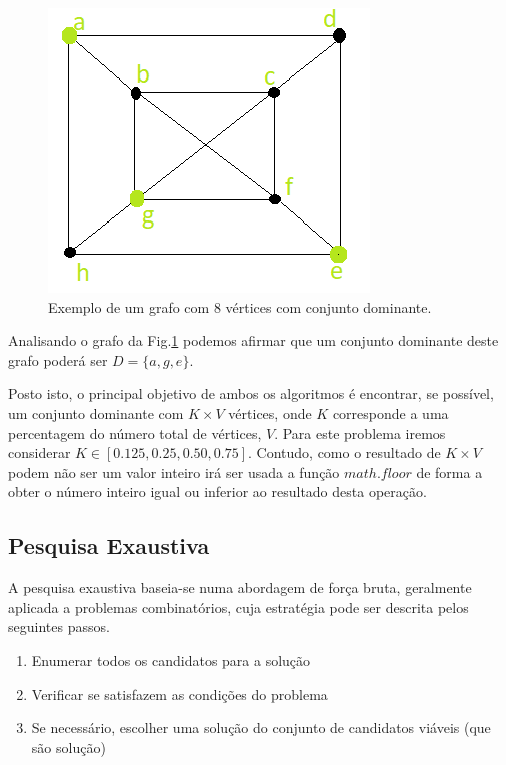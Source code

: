 \documentclass{revdetua}
\begin{document}
\begin{figure}[h!]
\centering
\includegraphics[scale = 1.0]{Figs/DominatingSET.png}
\caption{Exemplo de um grafo com 8 vértices com conjunto dominante.\cite{Dominating}}
\label{DSET}
\end{figure}

Analisando o grafo da Fig.\ref{DSET} podemos afirmar que um conjunto dominante deste grafo poderá ser $D = \{a, g, e\}$.

Posto isto, o principal objetivo de ambos os algoritmos é encontrar, se possível, um conjunto dominante com $K \times V$ vértices, onde $K$ corresponde a uma percentagem do número total de vértices, $V$. Para este problema iremos considerar $K \in [0.125, 0.25, 0.50, 0.75]$. Contudo, como o resultado de $K \times V$ podem não ser um valor inteiro irá ser usada a função $math.floor$ de forma a obter o número inteiro igual ou inferior ao resultado desta operação.

\subsection{Pesquisa Exaustiva}
A pesquisa exaustiva baseia-se numa abordagem de força bruta, geralmente aplicada a problemas combinatórios, cuja estratégia pode ser descrita pelos seguintes passos.\cite{Slides}
\begin{enumerate}
\label{enum:features}
    \item[1.] Enumerar todos os candidatos para a solução
    \item[2.] Verificar se satisfazem as condições do problema
    \item[3.] Se necessário, escolher uma solução do conjunto de candidatos viáveis (que são solução)
\end{enumerate}
\end{document}

